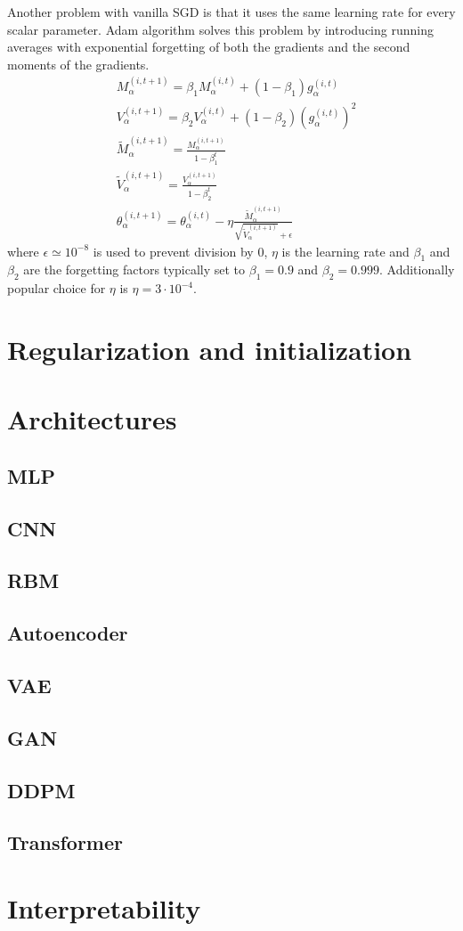 \documentclass{myclass}
\begin{document}
Another problem with vanilla SGD is that it uses the same learning rate for every scalar parameter. Adam algorithm solves this problem by introducing running averages with exponential forgetting of both the gradients and the second moments of the gradients.
\[\boxed{\begin{split}
   &M_\alpha^{(i,t+1)} = \beta_1 M_\alpha^{(i,t)} + (1-\beta_1) g_\alpha ^{(i,t)} \\
   &V_\alpha ^{(i,t+1)} = \beta_2 V_\alpha^{(i,t)} + (1 - \beta_2) \left(g_\alpha^{(i,t)}\right)^2 \\
   &\tilde{M}_\alpha^{(i,t+1)} = \frac{M_\alpha^{(i,t+1)}}{1 - \beta_1^t} \\
   &\tilde{V}_\alpha^{(i,t+1)}=\frac{ V_\alpha^{(i,t+1)}}{1 - \beta_2^t} \\
   &\theta_\alpha ^{(i,t+1)} = \theta_\alpha ^{(i,t)} - \eta \frac{\tilde{M}_\alpha^{(i,t+1)}}{\sqrt{\tilde{V}_\alpha^{(i,t+1)}} + \epsilon}
\end{split}
}\]
where \(\epsilon \simeq 10^{-8}\)  is used to prevent division by 0, \(\eta\) is the learning rate and \(\beta_1\) and \(\beta_2\) are the forgetting factors typically set to \(\beta_1=0.9\) and \(\beta_2=0.999\). Additionally popular choice for \(\eta\) is \(\eta = 3\cdot10^{-4}\).

\section{Regularization and initialization}

\section{Architectures}

\subsection{MLP}
\subsection{CNN}
\subsection{RBM}
\subsection{Autoencoder}
\subsection{VAE}
\subsection{GAN}
\subsection{DDPM}
\subsection{Transformer}

\section{Interpretability}
\end{document}
